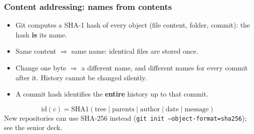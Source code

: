 \documentclass[aspectratio=169,10pt,compress]{beamer}
\begin{document}
\begin{frame}[t,fragile] \frametitle{Content addressing: names from contents}
  \begin{itemize}
    \item Git computes a SHA-1 hash of every object (file content, folder, commit): the hash \textbf{is} its name.
    \item Same content $\Rightarrow$ same name: identical files are stored once.
    \item Change one byte $\Rightarrow$ a different name, and different names for every commit after it.
          History cannot be changed silently.
    \item A commit hash identifies the \textbf{entire} history up to that commit.
  \end{itemize}
  \[
  	\mathrm{id}(c) = \mathrm{SHA1}(\text{tree} \mid \text{parents} \mid \text{author} \mid \text{date} \mid \text{message})
  \]
  \small New repositories can use SHA-256 instead (\texttt{git init --object-format=sha256}); see the senior deck.
\end{frame}

\end{document}
